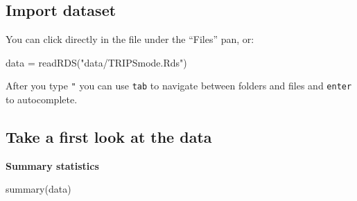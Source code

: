 \documentclass[
  letterpaper,
  DIV=11,
  numbers=noendperiod]{scrreprt}
\newenvironment{Shaded}{\begin{snugshade}}{\end{snugshade}}
\newcommand{\FunctionTok}[1]{\textcolor[rgb]{0.28,0.35,0.67}{#1}}
\newcommand{\NormalTok}[1]{\textcolor[rgb]{0.00,0.23,0.31}{#1}}
\newcommand{\OtherTok}[1]{\textcolor[rgb]{0.00,0.23,0.31}{#1}}
\newcommand{\StringTok}[1]{\textcolor[rgb]{0.13,0.47,0.30}{#1}}
\begin{document}
\subsection{Import dataset}\label{import-dataset}

You can click directly in the file under the ``Files'' pan, or:

\begin{Shaded}
\begin{Highlighting}[]
\NormalTok{data }\OtherTok{=} \FunctionTok{readRDS}\NormalTok{(}\StringTok{"data/TRIPSmode.Rds"}\NormalTok{)}
\end{Highlighting}
\end{Shaded}

\begin{tcolorbox}[enhanced jigsaw, breakable, left=2mm, colframe=quarto-callout-tip-color-frame, leftrule=.75mm, bottomrule=.15mm, arc=.35mm, rightrule=.15mm, colback=white, opacityback=0, toprule=.15mm]
\begin{minipage}[t]{5.5mm}
\textcolor{quarto-callout-tip-color}{\faLightbulb}
\end{minipage}%
\begin{minipage}[t]{\textwidth - 5.5mm}

After you type \texttt{"} you can use \texttt{tab} to navigate between
folders and files and \texttt{enter} to autocomplete.

\end{minipage}%
\end{tcolorbox}

\subsection{Take a first look at the
data}\label{take-a-first-look-at-the-data}

\textbf{Summary statistics}

\begin{Shaded}
\begin{Highlighting}[]
\FunctionTok{summary}\NormalTok{(data)}
\end{Highlighting}
\end{Shaded}
\end{document}
